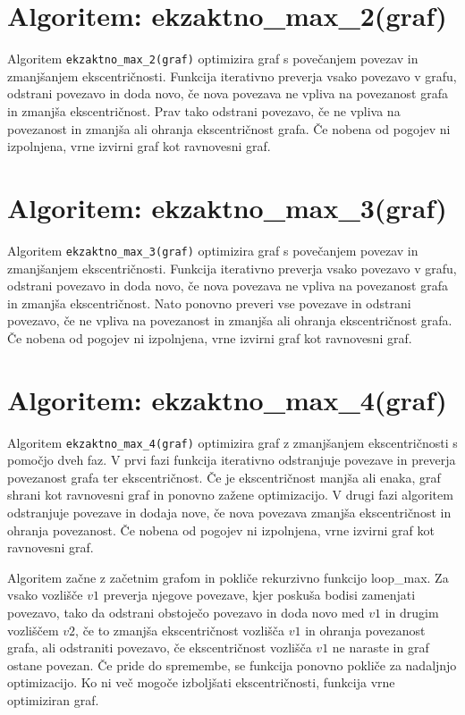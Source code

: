 \documentclass[fin1, tisk]{fmfdelo}
\begin{document}
\section{Algoritem: ekzaktno\_max\_2(graf)}

Algoritem \texttt{ekzaktno\_max\_2(graf)} optimizira graf s povečanjem povezav in zmanjšanjem ekscentričnosti.
Funkcija iterativno preverja vsako povezavo v grafu, odstrani povezavo in doda novo, če nova povezava ne vpliva
na povezanost grafa in zmanjša ekscentričnost. Prav tako odstrani povezavo, če ne vpliva na povezanost in zmanjša
ali ohranja ekscentričnost grafa. Če nobena od pogojev ni izpolnjena, vrne izvirni graf kot ravnovesni graf.

\section{Algoritem: ekzaktno\_max\_3(graf)}

Algoritem \texttt{ekzaktno\_max\_3(graf)} optimizira graf s povečanjem povezav in zmanjšanjem ekscentričnosti.
Funkcija iterativno preverja vsako povezavo v grafu, odstrani povezavo in doda novo, če nova povezava ne vpliva
na povezanost grafa in zmanjša ekscentričnost. Nato ponovno preveri vse povezave in odstrani povezavo,
če ne vpliva na povezanost in zmanjša ali ohranja ekscentričnost grafa. Če nobena od pogojev ni izpolnjena,
vrne izvirni graf kot ravnovesni graf.

\section{Algoritem: ekzaktno\_max\_4(graf)}

Algoritem \texttt{ekzaktno\_max\_4(graf)} optimizira graf z zmanjšanjem ekscentričnosti s pomočjo dveh faz.
V prvi fazi funkcija iterativno odstranjuje povezave in preverja povezanost grafa ter ekscentričnost.
Če je ekscentričnost manjša ali enaka, graf shrani kot ravnovesni graf in ponovno zažene optimizacijo.
V drugi fazi algoritem odstranjuje povezave in dodaja nove, če nova povezava zmanjša ekscentričnost in ohranja povezanost.
Če nobena od pogojev ni izpolnjena, vrne izvirni graf kot ravnovesni graf.




Algoritem začne z začetnim grafom in pokliče rekurzivno funkcijo loop_max. 
Za vsako vozlišče $v1$ preverja njegove povezave, kjer poskuša bodisi zamenjati povezavo,
tako da odstrani obstoječo povezavo in doda novo med $v1$ in drugim vozliščem $v2$,
če to zmanjša ekscentričnost vozlišča $v1$ in ohranja povezanost grafa, ali odstraniti povezavo,
če ekscentričnost vozlišča $v1$ ne naraste in graf ostane povezan. Če pride do spremembe,
se funkcija ponovno pokliče za nadaljnjo optimizacijo. Ko ni več mogoče izboljšati ekscentričnosti,
funkcija vrne optimiziran graf.
\end{document}
